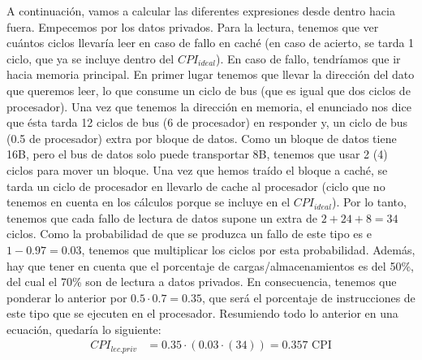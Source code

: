 \documentclass[12pt,a4paper]{article}
\begin{document}
A continuación, vamos a calcular las diferentes expresiones desde dentro hacia fuera. Empecemos por los datos privados. Para la lectura, tenemos que ver cuántos ciclos llevaría leer en caso de fallo en caché (en caso de acierto, se tarda 1 ciclo, que ya se incluye dentro del $CPI_{ideal}$). En caso de fallo, tendríamos que ir hacia memoria principal. En primer lugar tenemos que llevar la dirección del dato que queremos leer, lo que consume un ciclo de bus (que es igual que dos ciclos de procesador). Una vez que tenemos la dirección en memoria, el enunciado nos dice que ésta tarda 12 ciclos de bus (6 de procesador) en responder y, un ciclo de bus (0.5 de procesador) extra por bloque de datos. Como un bloque de datos tiene 16B, pero el bus de datos solo puede transportar 8B, tenemos que usar 2 (4) ciclos para mover un bloque. Una vez que hemos traído el bloque a caché, se tarda un ciclo de procesador en llevarlo de cache al procesador (ciclo que no tenemos en cuenta en los cálculos porque se incluye en el $CPI_{ideal}$). Por lo tanto, tenemos que cada fallo de lectura de datos supone un extra de $2+24+8=34$ ciclos. Como la probabilidad de que se produzca un fallo de este tipo es e $1-0.97=0.03$, tenemos que multiplicar los ciclos por esta probabilidad. Además, hay que tener en cuenta que el porcentaje de cargas/almacenamientos es del 50\%, del cual el 70\% son de lectura a datos privados. En consecuencia, tenemos que ponderar lo anterior por $0.5\cdot 0.7=0.35$, que será el porcentaje de instrucciones de este tipo que se ejecuten en el procesador. Resumiendo todo lo anterior en una ecuación, quedaría lo siguiente:
\begin{align*}
CPI_{lec.priv}&=0.35\cdot (0.03\cdot (34))=0.357\text{ CPI}
\end{align*}
\end{document}
